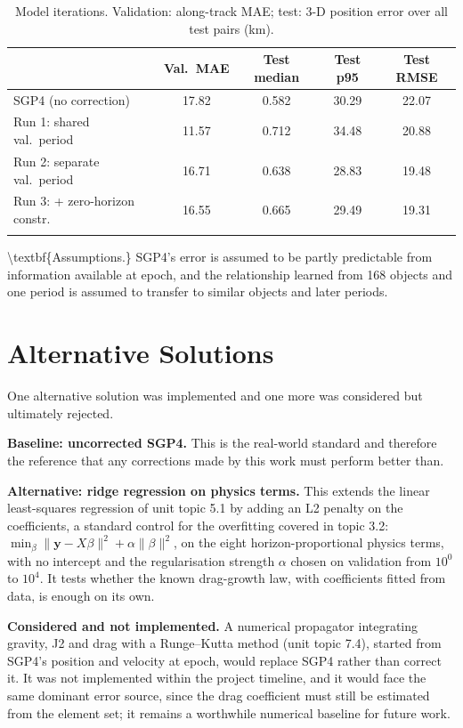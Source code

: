 \documentclass[11pt, a4paper]{article}
\begin{document}
\begin{table}[htbp]
\centering
\small
\captionsetup{width=0.8\linewidth}
\caption{Model iterations. Validation: along-track MAE; test: 3-D position error over all test pairs (km).}
\label{tab:runs}
\begin{tabular}{lcccc}
\toprule
 & Val.\ MAE & Test median & Test p95 & Test RMSE \\
\midrule
SGP4 (no correction) & 17.82 & 0.582 & 30.29 & 22.07 \\
Run 1: shared val.\ period & 11.57 & 0.712 & 34.48 & 20.88 \\
Run 2: separate val.\ period & 16.71 & 0.638 & 28.83 & 19.48 \\
Run 3: + zero-horizon constr. & 16.55 & 0.665 & 29.49 & 19.31 \\
\bottomrule
\multicolumn{5}{l}{}
\end{tabular}
\end{table}

\textbackslash{}textbf\{Assumptions.\} SGP4's error is assumed to be partly predictable from information available at epoch, and the relationship learned from 168 objects and one period is assumed to transfer to similar objects and later periods.

\section{Alternative Solutions}\label{sec:4}

One alternative solution was implemented and one more was considered but ultimately rejected.

\textbf{Baseline: uncorrected SGP4.} This is the real-world standard and therefore the reference that any corrections made by this work must perform better than.

\textbf{Alternative: ridge regression on physics terms.} This extends the linear least-squares regression of unit topic 5.1 by adding an L2 penalty on the coefficients, a standard control for the overfitting covered in topic 3.2: $\min_\beta \|\mathbf{y} - X\beta\|^2 + \alpha\|\beta\|^2$, on the eight horizon-proportional physics terms, with no intercept and the regularisation strength $\alpha$ chosen on validation from $10^0$ to $10^4$. It tests whether the known drag-growth law, with coefficients fitted from data, is enough on its own.

\textbf{Considered and not implemented.} A numerical propagator integrating gravity, J2 and drag with a Runge--Kutta method (unit topic 7.4), started from SGP4's position and velocity at epoch, would replace SGP4 rather than correct it. It was not implemented within the project timeline, and it would face the same dominant error source, since the drag coefficient must still be estimated from the element set; it remains a worthwhile numerical baseline for future work.
\end{document}
